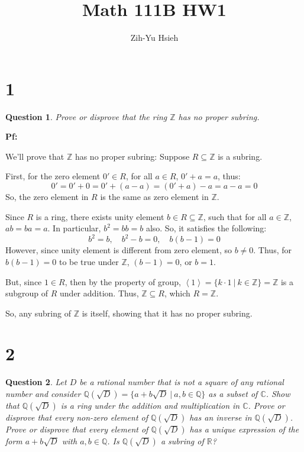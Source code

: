 \documentclass{article}
\title{Math 111B HW1}
\author{Zih-Yu Hsieh}
\newtheorem{question}{Question}
\begin{document}
\maketitle

\section*{1}
\begin{question}
    Prove or disprove that the ring $\mathbb{Z}$ has no proper subring.
\end{question}

\textbf{Pf:}

We'll prove that $\mathbb{Z}$ has no proper subring: Suppose $R\subseteq \mathbb{Z}$ is a subring.

\hfill

First, for the zero element $0'\in R$, for all $a\in R$, $0'+a = a$, thus: 
$$0' = 0'+0 = 0' + (a-a) = (0'+a)-a = a-a = 0$$
So, the zero element in $R$ is the same as zero element in $\mathbb{Z}$.

\hfill

Since $R$ is a ring, there exists unity element $b\in R\subseteq \mathbb{Z}$, such that for all $a\in\mathbb{Z}$,
$ab=ba=a$. In particular, $b^2=bb=b$ also. So, it satisfies the following:
$$b^2=b,\quad b^2-b=0,\quad b(b-1)=0$$
However, since unity element is different from zero element, so $b\neq 0$. Thus, for $b(b-1)=0$ to be true under $\mathbb{Z}$,
$(b-1)=0$, or $b=1$.

\hfill

But, since $1\in R$, then by the property of group, $\left<1\right> = \{k\cdot 1\ |\ k\in\mathbb{Z}\} = \mathbb{Z}$ is a subgroup of $R$ under addition.
Thus, $\mathbb{Z}\subseteq R$, which $R=\mathbb{Z}$.

So, any subring of $\mathbb{Z}$ is itself, showing that it has no proper subring.

\break

\section*{2}
\begin{question}
    Let $D$ be a rational number that is not a square of any rational number and consider
    $\mathbb{Q}(\sqrt{D})=\{a+b\sqrt{D}\ |\ a,b\in\mathbb{Q}\}$ as a subset of $\mathbb{C}$. 
    Show that $\mathbb{Q}(\sqrt{D})$ is a ring under the addition and multiplication in $\mathbb{C}$. 
    Prove or disprove that every non-zero element of $\mathbb{Q}(\sqrt{D})$ has an inverse in $\mathbb{Q}(\sqrt{D})$. 
    Prove or disprove that every element of $\mathbb{Q}(\sqrt{D})$ has a unique expression of the form 
    $a+b\sqrt{D}$ with $a,b\in\mathbb{Q}$. Is $\mathbb{Q}(\sqrt{D})$ a subring of $\mathbb{R}$?
\end{question}
\end{document}
